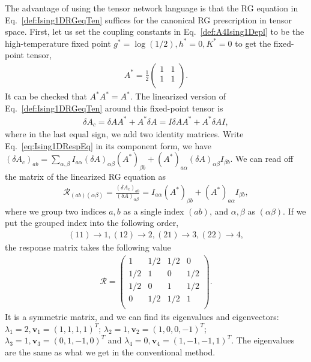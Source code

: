 \documentclass[aps,prb,reprint,superscriptaddress,floatfix]{revtex4-2}
\begin{document}
The advantage of using the tensor network language is that the RG equation in Eq.~\eqref{def:Ising1DRGeqTen} suffices for the canonical RG prescription in tensor space. 
First, let us set the coupling constants in Eq.~\eqref{def:A4Ising1Depl} to be the high-temperature fixed point $g^* = \log{\left(1/2\right)}, h^*=0, K^* = 0$ to get the fixed-point tensor,
%
\begin{align}\label{eq:fixedA4Ising1D}
    A^* = \frac{1}{2}
\begin{pmatrix}
    1 & 1 \\
    1 & 1 \\
\end{pmatrix}.
\end{align}
%
It can be checked that $A^* A^* = A^*$. 
The linearized version of Eq.~\eqref{def:Ising1DRGeqTen} around this fixed-point tensor is
%
\begin{align}\label{eq:Ising1DRespEq}
    \delta A_c = \delta A A^* + A^* \delta A = I \delta A A^* + A^*
    \delta A I,
\end{align}
%
where in the last equal sign, we add two identity matrices. 
Write Eq.~\eqref{eq:Ising1DRespEq} in its component form, we have $\left(\delta A_c\right)_{ab} = \sum_{\alpha,\beta}I_{a\alpha}\left(\delta A\right)_{\alpha\beta} \left(A^*\right)_{\beta b} + \left(A^*\right)_{a\alpha} \left(\delta A\right)_{\alpha \beta} I_{\beta b}$. 
We can read off the matrix of the linearized RG equation as
%
\begin{align}\label{eq:Ising1DRespMat}
    \mathcal{R}_{(ab)(\alpha \beta)} = \frac{\left(\delta
    A_c\right)_{ab}}{\left(\delta A\right)_{\alpha \beta}} =
    I_{a\alpha}\left(A^*\right)_{\beta b} + \left(A^*\right)_{a\alpha}
    I_{\beta b},
\end{align}
%
where we group two indices $a,b$ as a single index $(ab)$, and $\alpha,\beta$ as $(\alpha\beta)$. 
If we put the grouped index into the following order,
%
\begin{align}\label{def:orderConvention}
    (11) \rightarrow 1, (12) \rightarrow 2, (21) \rightarrow 3, (22)
    \rightarrow 4,
\end{align}
%
the response matrix takes the following value
%
\begin{align}\label{eq:Ising1DRespMatNum}
    \mathcal{R} = 
\begin{pmatrix}
    1 & 1/2 & 1/2 & 0 \\
    1/2 & 1 & 0 & 1/2 \\
    1/2 & 0 & 1 & 1/2 \\
    0 & 1/2 & 1/2 & 1 \\
\end{pmatrix}.
\end{align}
%
It is a symmetric matrix, and we can find its eigenvalues and eigenvectors: $\lambda_1 = 2,\mathbf{v}_1 = (1,1,1,1)^T$; $\lambda_2 = 1,\mathbf{v}_2 = (1,0,0,-1)^T$; $\lambda_3 =1, \mathbf{v}_3 = (0,1,-1,0)^T$ and $\lambda_4 = 0, \mathbf{v}_4 = (1,-1,-1,1)^T$. 
The eigenvalues are the same as what we get in the conventional method. 
%
\end{document}
